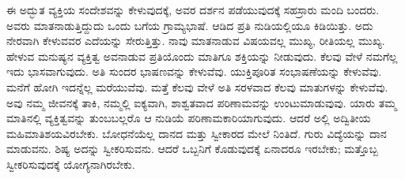 ಈ ಅದ್ಭುತ ವ್ಯಕ್ತಿಯ ಸಂದೇಶವನ್ನು ಕೇಳುವುದಕ್ಕೆ, ಅವರ ದರ್ಶನ ಪಡೆಯುವುದಕ್ಕೆ ಸಹಸ್ರಾರು ಮಂದಿ ಬಂದರು. ಅವರು ಮಾತನಾಡುತ್ತಿದ್ದುದು ಒಂದು ಬಗೆಯ ಗ್ರಾಮ್ಯಭಾಷೆ. ಆಡಿದ ಪ್ರತಿ ನುಡಿಯಲ್ಲಿಯೂ ಕಿಡಿಯಿತ್ತು. ಅದು ನೇರವಾಗಿ ಕೇಳುವವರ ಎದೆಯನ್ನು ಸೇರುತ್ತಿತ್ತು. ನಾವು ಮಾತನಾಡುವ ವಿಷಯವಲ್ಲ ಮುಖ್ಯ, ರೀತಿಯಲ್ಲ ಮುಖ್ಯ. ಹೇಳುವ ಮನುಷ್ಯನ ವ್ಯಕ್ತಿತ್ವ ಅವನಾಡುವ ಪ್ರತಿಯೊಂದು ಮಾತಿಗೂ ಶಕ್ತಿಯನ್ನು ನೀಡುವುದು. ಕೆಲವು ವೇಳೆ ನಮಗೆಲ್ಲ ಇದು ಭಾಸವಾಗುವುದು. ಅತಿ ಸುಂದರ ಭಾಷಣವನ್ನು ಕೇಳುವೆವು. ಯುಕ್ತಿಪೂರಿತ ಸಂಭಾಷಣೆಯನ್ನು ಕೇಳುವೆವು. ಮನೆಗೆ ಹೋಗಿ ಇದನ್ನೆಲ್ಲ ಮರೆಯುವೆವು. ಮತ್ತೆ ಕೆಲವು ವೇಳೆ ಅತಿ ಸರಳವಾದ ಕೆಲವು ಮಾತುಗಳನ್ನು ಕೇಳುವೆವು. ಅವು ನಮ್ಮ ಜೀವನಕ್ಕೆ ತಾಕಿ, ನಮ್ಮಲ್ಲಿ ಐಕ್ಯವಾಗಿ, ಶಾಶ್ವತವಾದ ಪರಿಣಾಮವನ್ನು ಉಂಟುಮಾಡುವುವು. ಯಾರು ತಮ್ಮ ಮಾತಿನಲ್ಲಿ ವ್ಯಕ್ತಿತ್ವವನ್ನು ತುಂಬಬಲ್ಲರೊ ಆ ನುಡಿಯೆ ಪರಿಣಾಮಕಾರಿಯಾಗುವುದು. ಆದರೆ ಅಲ್ಲಿ ಅದ್ವಿತೀಯ ಮಹಿಮಾತಿಶಯವಿರಬೇಕು. ಬೋಧನೆಯೆಲ್ಲ ದಾನದ ಮತ್ತು ಸ್ವೀಕಾರದ ಮೇಲೆ ನಿಂತಿದೆ. ಗುರು ವಿದ್ಯೆಯನ್ನು ದಾನ ಮಾಡುವನು. ಶಿಷ್ಯ ಅದನ್ನು ಸ್ವೀಕರಿಸುವನು. ಆದರೆ ಒಬ್ಬನಿಗೆ ಕೊಡುವುದಕ್ಕೆ ಏನಾದರೂ ಇರಬೇಕು; ಮತ್ತೊಬ್ಬ ಸ್ವೀಕರಿಸುವುದಕ್ಕೆ ಯೋಗ್ಯನಾಗಿರಬೇಕು.

